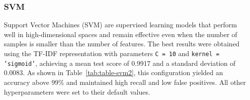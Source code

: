 \documentclass[conference]{IEEEtran}
\begin{document}
\begin{table}[H]
\caption{\label{tab:table-ada2} Performance Metrics for the AdaBoost Classifier.}
\end{table}

\subsubsection{SVM}
Support Vector Machines (SVM) are supervised learning models that perform well in high-dimensional spaces and remain effective even when the number of samples is smaller than the number of features. The best results were obtained using the TF-IDF representation with parameters \texttt{C = 10} and \texttt{kernel = 'sigmoid'}, achieving a mean test score of 0.9917 and a standard deviation of 0.0083. As shown in Table~\ref{tab:table-svm2}, this configuration yielded an accuracy above 99\% and maintained high recall and low false positives. All other hyperparameters were set to their default values.


\begin{table}[H]
\caption{\label{tab:table-svm} Metrics for the SVM Classifier.}

\end{table}

\begin{table}[H]
\caption{\label{tab:table-svm2} Performance Metrics for the SVM Classifier.}
\end{table}
\end{document}
